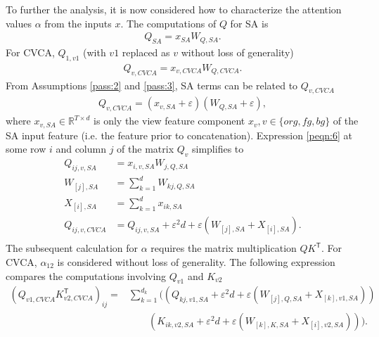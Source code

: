 To further the analysis, it is now considered how to characterize the attention values $\alpha$ from the inputs $x$. The computations of $Q$ for SA is
\begin{equation}
\begin{aligned}
    Q_{SA} = x_{SA} W_{Q,SA}.
\end{aligned}
\end{equation}
For CVCA, $Q_{1,v1}$ (with $v1$ replaced as $v$ without loss of generality)
\begin{equation}
\begin{aligned}
    Q_{v,CVCA} = x_{v,CVCA} W_{Q,CVCA}.
\end{aligned}
\end{equation}
From Assumptions \ref{pass:2} and \ref{pass:3}, SA terms can be related to $Q_{v,CVCA}$
\begin{equation}
\begin{aligned}
    Q_{v,CVCA} = (x_{v,SA} + \varepsilon) (W_{Q,SA} + \varepsilon),
\end{aligned}
\label{peqn:6}
\end{equation}
where $x_{v,SA} \in \mathbb{R}^{T \times d}$ is only the view feature component $x_{v}, v \in \{org, fg, bg\}$ of the SA input feature (i.e. the feature prior to concatenation). Expression \ref{peqn:6} at some row $i$ and column $j$ of the matrix $Q_v$ simplifies to
\begin{equation}
\begin{aligned}
    Q_{ij,v,SA} & = x_{i,v,SA} W_{j,Q,SA} \\
    W_{[j],SA} & = \sum_{k=1}^{d} W_{kj,Q,SA} \\
    X_{[i],SA} & = \sum_{k=1}^{d} x_{ik,SA}  \\
    Q_{ij,v,CVCA} & = Q_{ij,v,SA} + \varepsilon^2 d + \varepsilon (W_{[j],SA} + X_{[i],SA}). \\
\end{aligned}
\label{peqn:7}
\end{equation}
The subsequent calculation for $\alpha$ requires the matrix multiplication $Q K^{\mathsf{T}}$. For CVCA, $\alpha_{12}$ is considered without loss of generality. The following expression compares the computations involving $Q_{v1}$ and $K_{v2}$
\begin{equation}
\begin{aligned}
    (Q_{v1,CVCA} K_{v2,CVCA}^{\mathsf{T}})_{ij} = & \sum_{k=1}^{d_k} ((Q_{kj,v1,SA} + \varepsilon^2 d + \varepsilon (W_{[j],Q,SA} + X_{[k],v1,SA})) \\
    &\qquad (K_{ik,v2,SA} + \varepsilon^2 d + \varepsilon (W_{[k],K,SA} + X_{[i],v2,SA}))). \\
\end{aligned}
\label{peqn:8}
\end{equation}

